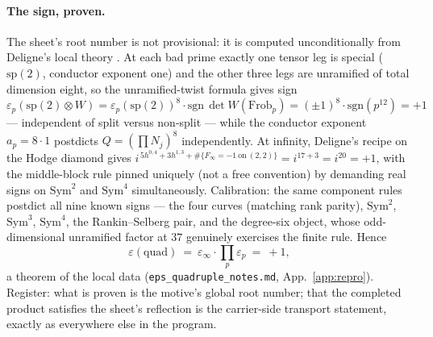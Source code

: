 \documentclass[11pt]{article}
\theoremstyle{definition}
\theoremstyle{remark}
\begin{document}
\paragraph{The sign, proven.} The sheet's root number is not provisional: it
is computed unconditionally from Deligne's local theory
\cite{DeligneEps,TateNTB}. At each bad prime exactly one tensor leg is special
($\mathrm{sp}(2)$, conductor exponent one) and the other three legs are
unramified of total dimension eight, so the unramified-twist formula gives
sign $\varepsilon_p(\mathrm{sp}(2)\otimes W)
=\varepsilon_p(\mathrm{sp}(2))^{8}\cdot\mathrm{sgn}\,\det W(\mathrm{Frob}_p)
=(\pm1)^8\cdot\mathrm{sgn}(p^{12})=+1$ --- independent of split versus
non-split \cite{Rohrlich} --- while the conductor exponent
$a_p=8\cdot1$ postdicts $Q=(\prod N_j)^8$ independently. At infinity, Deligne's
recipe on the Hodge diamond gives
$i^{\,5h^{0,4}+3h^{1,3}+\#\{F_\infty=-1\ \text{on}\ (2,2)\}}=i^{17+3}=i^{20}=+1$,
with the middle-block rule pinned uniquely (not a free convention) by
demanding real signs on $\mathrm{Sym}^2$ and $\mathrm{Sym}^4$ simultaneously.
Calibration: the same component rules postdict all nine known signs --- the
four curves (matching rank parity), $\mathrm{Sym}^2$, $\mathrm{Sym}^3$,
$\mathrm{Sym}^4$, the Rankin--Selberg pair, and the degree-six object, whose
odd-dimensional unramified factor at $37$ genuinely exercises the finite rule.
Hence
\[
  \varepsilon(\mathrm{quad})\ =\ \varepsilon_\infty\cdot\prod_p\varepsilon_p
  \ =\ +1,
\]
a theorem of the local data (\texttt{eps\_quadruple\_notes.md},
App.~\ref{app:repro}). Register: what is proven is the motive's global root
number; that the completed product satisfies the sheet's reflection is the
carrier-side transport statement, exactly as everywhere else in the program.
\end{document}
